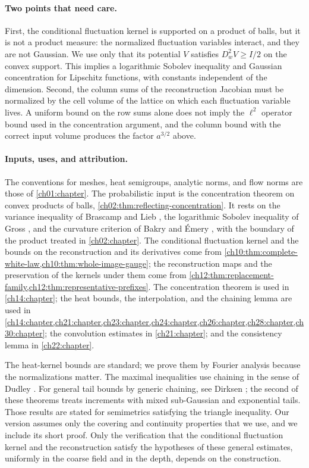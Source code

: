 \paragraph{Two points that need care.}
First, the conditional fluctuation kernel is supported on a product of balls, but it is not a product measure: the normalized fluctuation variables interact, and they are not Gaussian. We use only that its potential $V$ satisfies $D_w^2V\ge I/2$ on the convex support. This implies a logarithmic Sobolev inequality and Gaussian concentration for Lipschitz functions, with constants independent of the dimension. Second, the column sums of the reconstruction Jacobian must be normalized by the cell volume of the lattice on which each fluctuation variable lives. A uniform bound on the row sums alone does not imply the $\ell^2$ operator bound used in the concentration argument, and the column bound with the correct input volume produces the factor $a^{3/2}$ above.

\paragraph{Inputs, uses, and attribution.}
The conventions for meshes, heat semigroups, analytic norms, and flow norms are those of \cref{ch01:chapter}. The probabilistic input is the concentration theorem on convex products of balls, \cref{ch02:thm:reflecting-concentration}. It rests on the variance inequality of Brascamp and Lieb \cite{BrascampLieb1976}, the logarithmic Sobolev inequality of Gross \cite{Gross1975}, and the curvature criterion of Bakry and \'Emery \cite{BakryEmery1985}, with the boundary of the product treated in \cref{ch02:chapter}. The conditional fluctuation kernel and the bounds on the reconstruction and its derivatives come from \cref{ch10:thm:complete-white-law,ch10:thm:whole-image-gauge}; the reconstruction maps and the preservation of the kernels under them come from \cref{ch12:thm:replacement-family,ch12:thm:representative-prefixes}. The concentration theorem is used in \cref{ch14:chapter}; the heat bounds, the interpolation, and the chaining lemma are used in \cref{ch14:chapter,ch21:chapter,ch23:chapter,ch24:chapter,ch26:chapter,ch28:chapter,ch30:chapter}; the convolution estimates in \cref{ch21:chapter}; and the consistency lemma in \cref{ch22:chapter}.

The heat-kernel bounds are standard; we prove them by Fourier analysis because the normalizations matter. The maximal inequalities use chaining in the sense of Dudley \cite{Dudley1967}. For general tail bounds by generic chaining, see Dirksen \cite[Theorems~3.2 and~3.5]{Dirksen2015}; the second of these theorems treats increments with mixed sub-Gaussian and exponential tails. Those results are stated for semimetrics satisfying the triangle inequality. Our version assumes only the covering and continuity properties that we use, and we include its short proof. Only the verification that the conditional fluctuation kernel and the reconstruction satisfy the hypotheses of these general estimates, uniformly in the coarse field and in the depth, depends on the construction.

